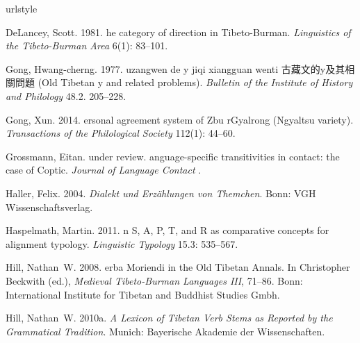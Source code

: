 \documentclass[oneside,a4paper,11pt]{article}
\newcommand{\zh}[1]{{\cn #1}}
\begin{document}
%
%
\begin{thebibliography}{39}
\providecommand{\natexlab}[1]{#1}
\providecommand{\url}[1]{#1}
\providecommand{\urlprefix}{}
\expandafter\ifx\csname urlstyle\endcsname\relax
  \providecommand{\doi}[1]{doi:\discretionary{}{}{}#1}\else
  \providecommand{\doi}{doi:\discretionary{}{}{}\begingroup
  \urlstyle{rm}\Url}\fi

DeLancey, Scott. 1981.
he category of direction in {T}ibeto-{B}urman.
\newblock \emph{Linguistics of the Tibeto-Burman Area} 6(1): 83--101.

Gong, Hwang-cherng. 1977.
uzangwen de y jiqi xiangguan wenti
  \zh{古藏文的y及其相關問題} ({O}ld {T}ibetan y and related
  problems).
\newblock \emph{Bulletin of the Institute of History and Philology} 48.2.
  205--228.

Gong, Xun. 2014.
ersonal agreement system of {Z}bu r{G}yalrong ({N}gyaltsu
  variety).
\newblock \emph{Transactions of the Philological Society} 112(1): 44--60.

Grossmann, Eitan. under review.
anguage-specific transitivities in contact: the case of {C}optic.
\newblock \emph{Journal of Language Contact} .

Haller, Felix. 2004.
\newblock \emph{{D}ialekt und {E}rzählungen von {T}hemchen}.
\newblock Bonn: VGH Wissenschaftsverlag.

Haspelmath, Martin. 2011.
n {S}, {A}, {P}, {T}, and {R} as comparative concepts for
  alignment typology.
\newblock \emph{Linguistic Typology} 15.3: 535--567.

Hill, Nathan~W. 2008.
erba {M}oriendi in the {O}ld {T}ibetan {A}nnals.
\newblock In Christopher Beckwith (ed.), \emph{{M}edieval {T}ibeto-{B}urman
  {L}anguages {III}}, 71--86. Bonn: International Institute for Tibetan and
  Buddhist Studies Gmbh.

\bibitem[{Hill(2010{\natexlab{a}})}]{hill10dictionary}
Hill, Nathan~W. 2010{\natexlab{a}}.
\newblock \emph{{A} {L}exicon of {T}ibetan {V}erb {S}tems as {R}eported by the
  {G}rammatical {T}radition}.
\newblock Munich: Bayerische Akademie der Wissenschaften.


\end{thebibliography}
\end{document}
